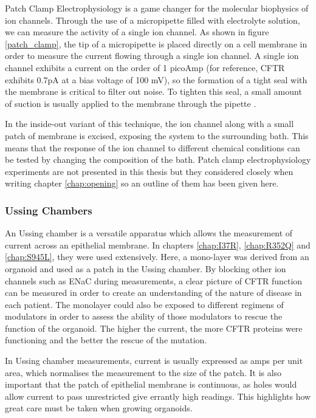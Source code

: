 Patch Clamp Electrophysiology is a game changer for the molecular biophysics of ion channels. Through the use of a micropipette filled with electrolyte solution, we can measure the activity of a single ion channel. As shown in figure \ref{patch_clamp}, the tip of a micropipette is placed directly on a cell membrane in order to measure the current flowing through a single ion channel. A single ion channel exhibits a current on the order of 1 picoAmp (for reference, CFTR exhibits 0.7pA at a bias voltage of 100 mV), so the formation of a tight seal with the membrane is critical to filter out noise. To tighten this seal, a small amount of suction is usually applied to the membrane through the pipette \cite{aidley1996}.

In the inside-out variant of this technique, the ion channel along with a small patch of membrane is excised, exposing the system to the surrounding bath. This means that the response of the ion channel to different chemical conditions can be tested by changing the composition of the bath. Patch clamp electrophysiology experiments are not presented in this thesis but they considered closely when writing chapter \ref{chap:opening}  so an outline of them has been given here.

\subsubsection{Ussing Chambers}
An Ussing chamber is a versatile apparatus which allows the measurement of current across an epithelial membrane. In chapters \ref{chap:I37R}, \ref{chap:R352Q} and \ref{chap:S945L}, they were used extensively. Here, a mono-layer was derived from an organoid and used as a patch in the Ussing chamber. By blocking other ion channels such as ENaC during measurements, a clear picture of CFTR function can be measured in order to create an understanding of the nature of disease in each patient. The monolayer could also be exposed to different regimens of modulators in order to assess the ability of those modulators to rescue the function of the organoid. The higher the current, the more CFTR proteins were functioning and the better the rescue of the mutation.

In Ussing chamber measurements, current is usually expressed as amps per unit area, which normalises the measurement to the size of the patch. It is also important that the patch of epithelial membrane is continuous, as holes would allow current to pass unrestricted give errantly high readings. This highlights how great care must be taken when growing organoids. 


